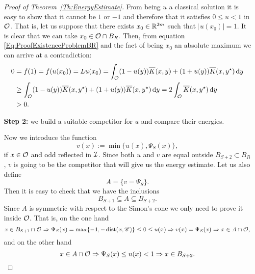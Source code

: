 \begin{proof}[Proof of Theorem~\ref{Th:EnergyEstimate}]
From being $u$ a classical solution it is easy to show that it cannot be $1$ or $-1$ and therefore that it satisfies $0\leq u < 1$ in $\mathcal{O}$. That is, let us suppose that there exists $x_0\in\mathbb{R}^{2m}$ such that $|u(x_0)|=1$. It is clear that we can take $x_0\in\mathcal{O}\cap B_R$. Then, from equation \eqref{Eq:ProofExistenceProblemBR} and the fact of being $x_0$ an absolute maximum we can arrive at a contradiction:
\begin{align*}
0 &= f(1) = f(u(x_0)) = Lu(x_0) = \int_{\mathcal{O}} (1-u(y)) \overline{K}(x,y) + (1+u(y)) \overline{K}(x,y^\star)  \,\mathrm{d} y \\
&\geq \int_{\mathcal{O}} (1-u(y)) \overline{K}(x,y^\star) + (1+u(y)) \overline{K}(x,y^\star)  \,\mathrm{d} y = 2\int_{\mathcal{O}} \overline{K}(x,y^\star) \,\mathrm{d} y\\
&>0.
\end{align*}

\textbf{Step 2:} we build a suitable competitor for $u$ and compare their energies.

Now we introduce the function
$$ v(x) := \min\{u(x),\Psi_S(x)\}, $$
if $x\in \mathcal{O}$ and odd reflected in $\mathcal{I}$. Since both $u$ and $v$ are equal outside $B_{S+2} \subset B_R$, $v$ is going to be the competitor that will give us the energy estimate. Let us also define
$$ A = \{v=\Psi_S\}. $$
Then it is easy to check that we have the inclusions
$$ B_{S+1} \subseteq A \subseteq B_{S+2}. $$
Since $A$ is symmetric with respect to the Simon's cone we only need to prove it inside $\mathcal{O}$. That is, on the one hand
$$ x\in B_{S+1}\cap \mathcal{O} \Rightarrow \Psi_S(x) = \max\{-1,-\operatorname{dist}(x,\mathscr{C})\} \leq 0 \leq u(x) \Rightarrow v(x) = \Psi_S(x)  \Rightarrow x\in A\cap \mathcal{O},  $$
and on the other hand
$$ x\in A\cap \mathcal{O} \Rightarrow \Psi_S(x) \leq u(x) < 1 \Rightarrow x\in B_{S+2}.  $$


\end{proof}
